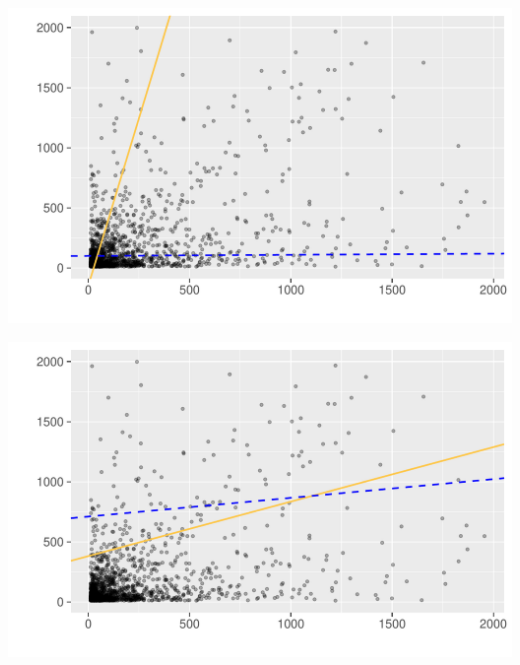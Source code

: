 \vspace{20 pt}

\begin{minipage}{.5\textwidth}
	\centering
	\includegraphics[page=1,scale=0.3]{../hypotheses/lm_in_ext_model_5_6.pdf}
  \label{fig:hyp1_model_5-6}
\end{minipage}
\begin{minipage}{.5\textwidth}
	\centering
	\includegraphics[page=1,scale=0.3]{../hypotheses/lm_in_ext_model_7_8.pdf}
  \label{fig:hyp1_model_7-8}
\end{minipage}

\vspace{20 pt}

